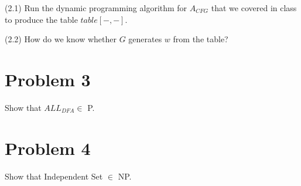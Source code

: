 \documentclass[11pt]{article}
\begin{document}
\noindent
(2.1) Run the dynamic programming algorithm for $A_{CFG}$ that we covered in class to produce the table $table[-,-]$.
\newline

\noindent
(2.2) How do we know whether $G$ generates $w$ from the table?
\newline
\newpage


\section*{Problem 3}

Show that $ALL_{DFA}\in$ P.

\section*{Problem 4}

Show that Independent Set $\in$ NP.
\newline
\end{document}
